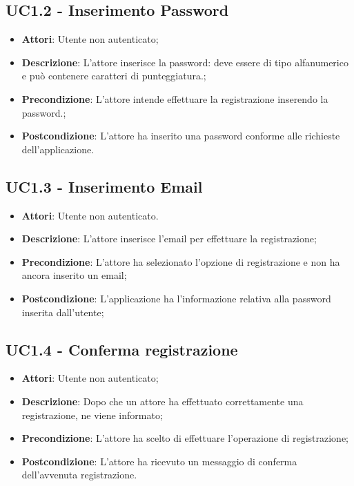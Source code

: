 \subsection{UC1.2 - Inserimento Password} 
\label{ssec:UC1.2} 
\begin{itemize} 
\item \textbf{Attori}: Utente non autenticato;
\item \textbf{Descrizione}: L’attore inserisce la password: deve essere di tipo alfanumerico e può contenere caratteri di punteggiatura.;
\item \textbf{Precondizione}: L'attore intende effettuare la registrazione inserendo la password.;
\item \textbf{Postcondizione}: L'attore ha inserito una password conforme alle richieste dell'applicazione.
\end{itemize} 
\subsection{UC1.3 - Inserimento Email} 
\label{ssec:UC1.3} 
\begin{itemize} 
\item \textbf{Attori}: Utente non autenticato.
\item \textbf{Descrizione}: L’attore inserisce l'email per effettuare la registrazione;
\item \textbf{Precondizione}: L'attore ha selezionato l'opzione di registrazione e non ha ancora inserito un email;
\item \textbf{Postcondizione}: L'applicazione ha l’informazione relativa alla password inserita dall’utente;
\end{itemize} 
\newpage
\subsection{UC1.4 - Conferma registrazione} 
\label{ssec:UC1.4} 
\begin{itemize} 
\item \textbf{Attori}: Utente non autenticato;
\item \textbf{Descrizione}: Dopo che un attore ha effettuato correttamente una registrazione, ne viene informato;
\item \textbf{Precondizione}: L'attore ha scelto di effettuare l'operazione di registrazione;
\item \textbf{Postcondizione}: L'attore ha ricevuto un messaggio di conferma dell'avvenuta registrazione.
\end{itemize} 
